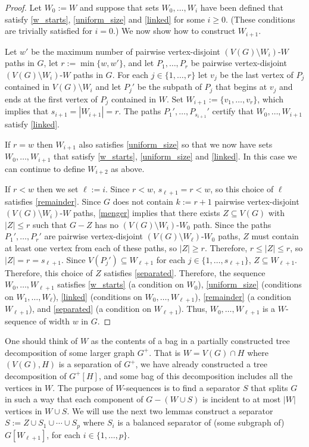 \documentclass{patmorin}
\begin{document}
\begin{proof}
  Let $W_0:=W$ and suppose that sets $W_0,\ldots,W_{i}$ have been defined that satisfy \ref{w_starts}, \ref{uniform_size} and \ref{linked} for some $i\ge 0$.  (These conditions are trivially satisfied for $i=0$.)  We now show how to construct $W_{i+1}$.

  Let $w'$ be the maximum number of pairwise vertex-disjoint $(V(G)\setminus W_i)$-$W$ paths in $G$, let $r:=\min\{w,w'\}$, and let $P_1,\ldots,P_{r}$ be pairwise vertex-disjoint $(V(G)\setminus W_i)$-$W$ paths in $G$.  For each $j\in\{1,\ldots,r\}$ let $v_j$ be the last vertex of $P_j$ contained in $V(G)\setminus W_i$ and let $P_j'$ be the subpath of $P_j$ that begins at $v_j$ and ends at the first vertex of $P_j$ contained in $W$.  Set $W_{i+1}:=\{v_1,\ldots,v_r\}$, which implies that $s_{i+1}=|W_{i+1}|=r$.  The paths $P_1',\ldots,P_{s_{i+1}}'$ certify that $W_0,\ldots,W_{i+1}$ satisfy \ref{linked}.

  If $r=w$ then $W_{i+1}$ also satisfies \ref{uniform_size} so that we now have sets $W_0,\ldots,W_{i+1}$ that satisfy \ref{w_starts}, \ref{uniform_size} and \ref{linked}.  In this case we can continue to define $W_{i+2}$ as above.  
  
  If $r< w$ then we set $\ell:=i$. Since $r< w$, $s_{\ell+1}=r<w$, so this choice of $\ell$ satisfies \ref{remainder}.  Since $G$ does not contain $k:=r+1$ pairwise vertex-disjoint $(V(G)\setminus W_{i})$-$W$ paths, \cref{menger} implies that there exists $Z\subseteq V(G)$ with $|Z|\le r$ such that $G-Z$ has no $(V(G)\setminus W_{i})$-$W_0$ path.  Since the paths $P_1',\ldots,P_{r}'$ are pairwise vertex-disjoint  $(V(G)\setminus W_{\ell})$-$W_0$ paths, $Z$ must contain at least one vertex from each of these paths, so $|Z|\ge r$. Therefore, $r\le |Z|\le r$, so $|Z|=r=s_{\ell+1}$.  Since $V(P_j')\subseteq W_{\ell+1}$ for each $j\in\{1,\ldots,s_{\ell+1}\}$, $Z\subseteq W_{\ell+1}$.  Therefore, this choice of $Z$ satisfies \ref{separated}.  Therefore, the sequence $W_0,\ldots,W_{\ell+1}$ satisfies \ref{w_starts} (a condition on $W_0$), \ref{uniform_size} (conditions on $W_1,\ldots,W_{\ell}$), \ref{linked} (conditions on $W_0,\ldots,W_{\ell+1}$), \ref{remainder} (a condition $W_{\ell+1}$), and \ref{separated} (a condition on $W_{\ell+1}$).  Thus, $W_0,\ldots,W_{\ell+1}$ is a $W$-sequence of width $w$ in $G$.
\end{proof}

One should think of $W$ as the contents of a bag in a partially constructed tree decomposition of some larger graph $G^+$.  That is $W=V(G)\cap H$ where $(V(G),H)$ is a separation of $G^+$, we have already constructed a tree decomposition of $G^+[H]$, and some bag of this decomposition includes all the vertices in $W$.  The purpose of $W$-sequences is to find a separator $S$ that splits $G$ in such a way that each component of $G-(W\cup S)$ is incident to at most $|W|$ vertices in $W\cup S$.  We will use the next two lemmas construct a separator $S:=Z\cup S_1\cup\cdots\cup S_p$ where $S_i$ is a balanced separator of (some subgraph of) $G[W_{\ell+1}]$, for each $i\in\{1,\ldots,p\}$.
\end{document}
